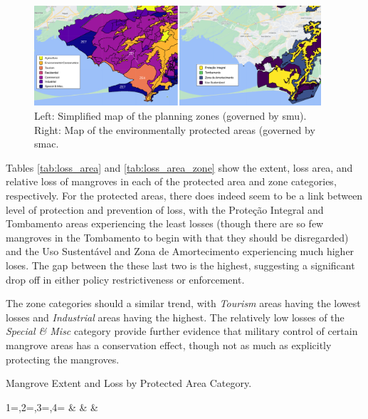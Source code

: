 \begin{figure}[!htb] 
\centering
\includegraphics[width=0.95\textwidth]{Figures/chap4/planning_zones_and_protected_areas.png}
\caption[Planning Zones \& Protected Areas]{Left: Simplified map of the planning zones (governed by \ac{smu}). Right: Map of the environmentally protected areas (governed by \ac{smac}.}
\label{fig:zones}
\end{figure}

Tables \ref{tab:loss_area} and \ref{tab:loss_area_zone} show the extent, loss area, and relative loss of mangroves in each of the protected area and zone categories, respectively. For the protected areas, there does indeed seem to be a link between level of protection and prevention of loss, with the Proteção Integral and Tombamento areas experiencing the least losses (though there are so few mangroves in the Tombamento to begin with that they should be disregarded) and the Uso Sustentável and Zona de Amortecimento experiencing much higher loses. The gap between the these last two is the highest, suggesting a significant drop off in either policy restrictiveness or enforcement.

The zone categories should a similar trend, with \textit{Tourism} areas having the lowest losses and \textit{Industrial} areas having the highest. The relatively low losses of the \textit{Special \& Misc} category provide further evidence that military control of certain mangrove areas has a conservation effect, though not as much as explicitly protecting the mangroves.



\begin{table}[!htb]\centering
	\caption[Mangrove Extent and Loss by Protected Area Category]{Mangrove Extent and Loss by Protected Area Category.} \label{tab:loss_area}
	\fontsize{8}{10}\selectfont
		{1=\year,2=\type,3=\platform,4=\agency}
		{\textbf{\year} & \type & \platform & \agency}
\end{table}

